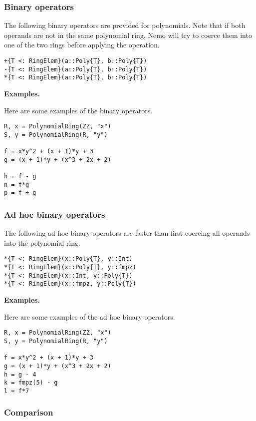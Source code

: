 \documentclass[a4paper,10pt]{article}
\begin{document}
\subsubsection{Binary operators}

The following binary operators are provided for polynomials. Note that
if both operands are not in the same polynomial ring, Nemo will try to
coerce them into one of the two rings before applying the operation.

\begin{lstlisting}
+{T <: RingElem}(a::Poly{T}, b::Poly{T})
-{T <: RingElem}(a::Poly{T}, b::Poly{T})
*{T <: RingElem}(a::Poly{T}, b::Poly{T})
\end{lstlisting}

\textbf{Examples.}

Here are some examples of the binary operators.

\begin{lstlisting}
R, x = PolynomialRing(ZZ, "x")
S, y = PolynomialRing(R, "y")

f = x*y^2 + (x + 1)*y + 3
g = (x + 1)*y + (x^3 + 2x + 2)

h = f - g
n = f*g
p = f + g
\end{lstlisting}

\subsubsection{Ad hoc binary operators}

The following ad hoc binary operators are faster than first coercing all
operands into the polynomial ring.

\begin{lstlisting}
*{T <: RingElem}(x::Poly{T}, y::Int)
*{T <: RingElem}(x::Poly{T}, y::fmpz)
*{T <: RingElem}(x::Int, y::Poly{T})
*{T <: RingElem}(x::fmpz, y::Poly{T})
\end{lstlisting}

\textbf{Examples.}

Here are some examples of the ad hoc binary operators.

\begin{lstlisting}
R, x = PolynomialRing(ZZ, "x")
S, y = PolynomialRing(R, "y")

f = x*y^2 + (x + 1)*y + 3
g = (x + 1)*y + (x^3 + 2x + 2)
h = g - 4
k = fmpz(5) - g
l = f*7
\end{lstlisting}

\subsubsection{Comparison}
\end{document}
